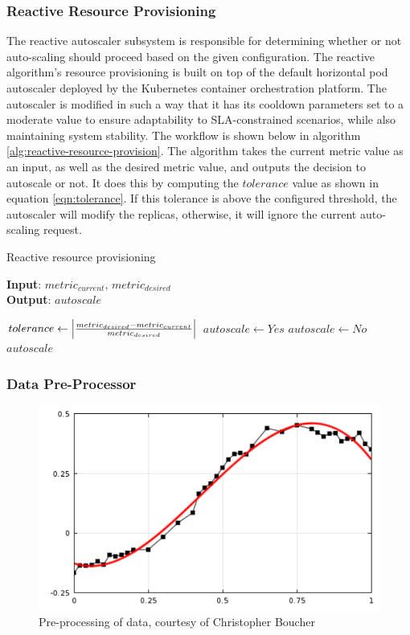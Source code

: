 \subsubsection{Reactive Resource Provisioning}

The reactive autoscaler subsystem is responsible for determining whether or not auto-scaling should proceed based on the given configuration. The reactive algorithm's resource provisioning is built on top of the default horizontal pod autoscaler deployed by the Kubernetes container orchestration platform. The autoscaler is modified in such a way that it has its cooldown parameters set to a moderate value to ensure adaptability to SLA-constrained scenarios, while also maintaining system stability. The workflow is shown below in algorithm \ref{alg:reactive-resource-provision}. The algorithm takes the current metric value as an input, as well as the desired metric value, and outputs the decision to autoscale or not. It does this by computing the $tolerance$ value as shown in equation \ref{eqn:tolerance}. If this tolerance is above the configured threshold, the autoscaler will modify the replicas, otherwise, it will ignore the current auto-scaling request.\par

\begin{algorithm}
    \caption{Reactive resource provisioning}
    \label{alg:reactive-resource-provision}
    \textbf{Input}: $metric_{current},\, metric_{desired}$\\
    \textbf{Output}: $autoscale$
    \begin{algorithmic}
        \State $tolerance \gets \abs{ \frac{metric_{desired} - metric_{current}}{metric_{desired}} }$
            \State $autoscale \gets Yes$
        \Else
            \State $autoscale \gets No$
        \EndIf
        \State \Return $autoscale$
    \end{algorithmic}
\end{algorithm}

\subsubsection{Data Pre-Processor}
\label{subsubsec:ch4-data-pre-process}

\begin{figure}[htb]
    \centering
    \caption{Pre-processing of data, courtesy of Christopher Boucher \cite{comsolcurvefitting}}
    \label{fig:data-pre-process}
    \includegraphics[width=0.6\linewidth]{Figures/Data-Pre-Processing.pdf}
\end{figure}

